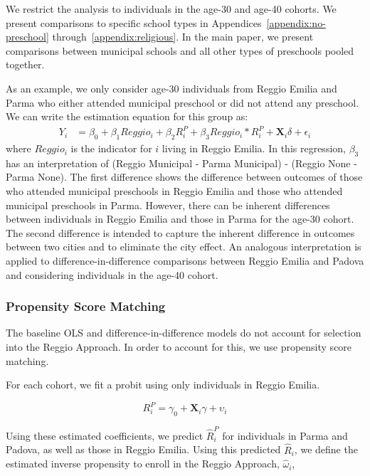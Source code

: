 We restrict the analysis to individuals in the age-30 and age-40 cohorts. We present comparisons to specific school types in Appendices~\ref{appendix:no-preschool} through~\ref{appendix:religious}. In the main paper, we present comparisons between municipal schools and all other types of preschools pooled together.

As an example, we only consider age-30 individuals from Reggio Emilia and Parma who either attended municipal preschool or did not attend any preschool. We can write the estimation equation for this group as:
\begin{eqnarray}  \label{eq:specific2}
Y_i & = \beta_0 + \beta_1 Reggio_i + \beta_2 R_i^P + \beta_3 Reggio_i * R_i^P + \bm{X}_i\delta + \epsilon_i 
\end{eqnarray}
where $Reggio_i$ is the indicator for $i$ living in Reggio Emilia. In this regression, $\beta_3$ has an interpretation of (Reggio Municipal - Parma Municipal) - (Reggio None - Parma None). The first difference shows the difference between outcomes of those who attended municipal preschools in Reggio Emilia and those who attended municipal preschools in Parma. However, there can be inherent differences between individuals in Reggio Emilia and those in Parma for the age-30 cohort. The second difference is intended to capture the inherent difference in outcomes between two cities and to eliminate the city effect. An analogous interpretation is applied to difference-in-difference comparisons between Reggio Emilia and Padova and considering individuals in the age-40 cohort. 

\subsubsection{Propensity Score Matching}
The baseline OLS and difference-in-difference models do not account for selection into the Reggio Approach. In order to account for this, we use propensity score matching.

For each cohort, we fit a probit using only individuals in Reggio Emilia. 

\begin{equation}
	R_i^{P} = \gamma_0 + \bm{X}_i\gamma + \upsilon_i
\end{equation}

Using these estimated coefficients, we predict $\hat{R}_i^{P}$ for individuals in Parma and Padova, as well as those in Reggio Emilia. Using this predicted $\hat{R}_i$, we define the estimated inverse propensity to enroll in the Reggio Approach, $\hat{\omega}_i$,

